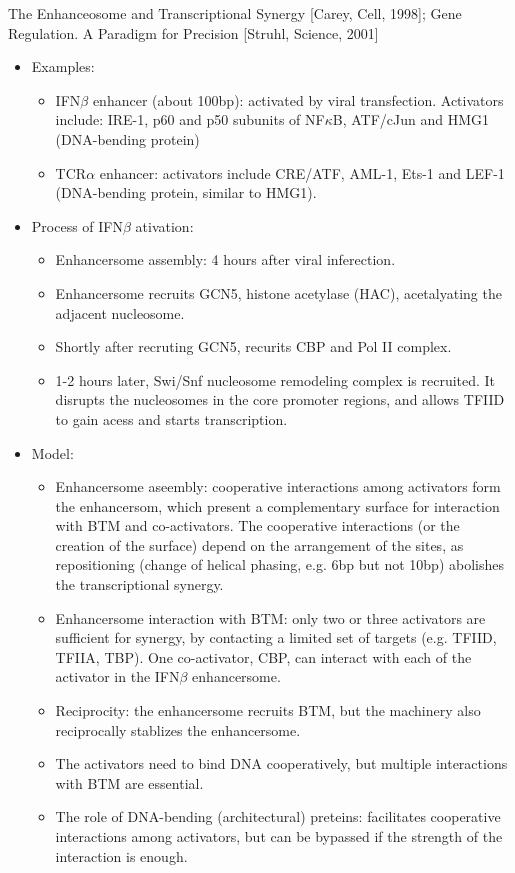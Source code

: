 \documentclass{report}
\begin{document}
The Enhanceosome and Transcriptional Synergy [Carey, Cell, 1998]; Gene Regulation. A Paradigm for Precision [Struhl, Science, 2001]
\begin{itemize}
	\item Examples: 
	\begin{itemize}
		\item IFN$\beta$ enhancer (about 100bp): activated by viral transfection. Activators include: IRE-1, p60 and p50 subunits of NF$\kappa$B, ATF/cJun and HMG1 (DNA-bending protein)
		\item TCR$\alpha$ enhancer: activators include CRE/ATF, AML-1, Ets-1 and LEF-1 (DNA-bending protein, similar to HMG1). 
	\end{itemize}
	
	\item Process of IFN$\beta$ ativation: 
	\begin{itemize}
		\item Enhancersome assembly: 4 hours after viral inferection. 
		\item Enhancersome recruits GCN5, histone acetylase (HAC), acetalyating the adjacent nucleosome. 
		\item Shortly after recruting GCN5, recurits CBP and Pol II complex. 
		\item 1-2 hours later, Swi/Snf nucleosome remodeling complex is recruited. It disrupts the nucleosomes in the core promoter regions, and allows TFIID to gain acess and starts transcription. 
	\end{itemize}
	
	\item Model:
	\begin{itemize}
		\item Enhancersome aseembly: cooperative interactions among activators form the enhancersom, which present a complementary surface for interaction with BTM and co-activators. The cooperative interactions (or the creation of the surface) depend on the arrangement of the sites, as repositioning (change of helical phasing, e.g. 6bp but not 10bp) abolishes the transcriptional synergy. 
		\item Enhancersome interaction with BTM: only two or three activators are sufficient for synergy, by contacting a limited set of targets (e.g. TFIID, TFIIA, TBP). One co-activator, CBP, can interact with each of the activator in the IFN$\beta$ enhancersome. 
		\item Reciprocity: the enhancersome recruits BTM, but the machinery also reciprocally stablizes the enhancersome. 
		\item The activators need to bind DNA cooperatively, but multiple interactions with BTM are essential. 
		\item The role of DNA-bending (architectural) preteins: facilitates cooperative interactions among activators, but can be bypassed if the strength of the interaction is enough. 
	\end{itemize}
	

\end{itemize}
\end{document}
